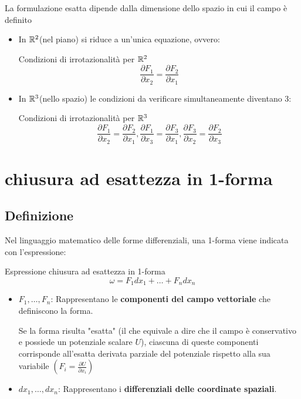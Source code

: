La formulazione esatta dipende dalla dimensione dello spazio in cui il campo è definito
\begin{itemize}
    \item In $\mathbb{R}^2$(nel piano) si riduce a un'unica equazione, ovvero: 
    
    \begin{definizione}{Condizioni di irrotazionalità per $\mathbb{R}^2$}
        {\large
            $$
                \frac{\partial F_{1}}{\partial x_{2}} = \frac{\partial F_{2}}{\partial x_{1}}
            $$
        }
    \end{definizione}
    
    \item In $\mathbb{R}^3$(nello spazio) le condizioni da verificare simultaneamente diventano 3:

    \begin{definizione}{Condizioni di irrotazionalità per $\mathbb{R}^3$}
       {\large
       $$
            \frac{\partial F_{1}}{\partial x_{2}} = \frac{\partial F_{2}}{\partial x_{1}} , 
            \frac{\partial F_{1}}{\partial x_{3}} = \frac{\partial F_{3}}{\partial x_{1}},
            \frac{\partial F_{3}}{\partial x_{2}} = \frac{\partial F_{2}}{\partial x_{3}}
        $$
       }
    \end{definizione}
\end{itemize}

\section{chiusura ad esattezza in 1-forma}
\subsection{Definizione}
Nel linguaggio matematico delle forme differenziali, una 1-forma viene indicata con l'espressione:

\begin{definizione}{Espressione chiusura ad esattezza in 1-forma}
    {\LARGE
        $$
            \omega = F_{1}dx_{1} + \dots + F_{n}dx_{n}
        $$
    }
\begin{itemize}
    \item $F_{1}, \dots , F_{n}$: Rappresentano le \textbf{componenti del campo vettoriale} che definiscono la forma.

    Se la forma risulta "esatta" (il che equivale a dire che il campo è conservativo e possiede un potenziale scalare $U$), ciascuna di queste componenti corrisponde all'esatta derivata parziale del potenziale rispetto alla sua variabile $(F_{i}= \frac{\partial U}{\partial x_{i}})$

    \item $dx_{1}, \dots , dx_{n}$: Rappresentano i \textbf{differenziali delle coordinate spaziali}.
\end{itemize}
\end{definizione}

